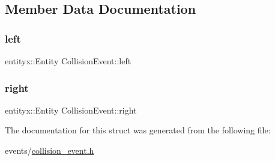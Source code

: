 \subsection{Member Data Documentation}
\mbox{\label{structCollisionEvent_ab04ed3aa79522e3f296245e39f7ba846}} 
\subsubsection{\texorpdfstring{left}{left}}
{\footnotesize\ttfamily entityx\+::\+Entity Collision\+Event\+::left}

\mbox{\label{structCollisionEvent_a665ecc7b6b9b4d54b44ab9d0d9930984}} 
\subsubsection{\texorpdfstring{right}{right}}
{\footnotesize\ttfamily entityx\+::\+Entity Collision\+Event\+::right}



The documentation for this struct was generated from the following file\+:\begin{DoxyCompactItemize}
\item 
events/\hyperlink{collision__event_8h}{collision\+\_\+event.\+h}\end{DoxyCompactItemize}
